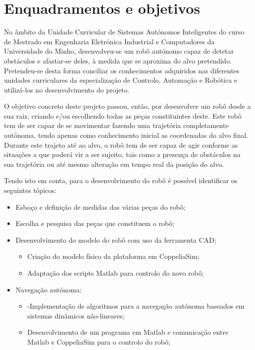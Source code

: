 \section{Enquadramentos e objetivos}
\label{sec:enq-e-obj}
%
No âmbito da Unidade Curricular de Sistemas Autónomos Inteligentes do curso de Mestrado em Engenharia Eletrónica Industrial e Computadores da Universidade do Minho, desenvolveu-se um robô autónomo capaz de detetar obstáculos e afastar-se deles, à medida que se aproxima do alvo pretendido. Pretendeu-se desta forma conciliar os conhecimentos adquiridos nas diferentes unidades curriculares da especialização de Controlo, Automação e Robótica e utilizá-los no desenvolvimento do projeto. 

O objetivo concreto deste projeto passou, então, por desenvolver um robô desde a sua raiz, criando e/ou escolhendo todas as peças constituintes deste. Este robô tem de ser capaz de se movimentar fazendo uma trajetória completamente autónoma, tendo apenas como conhecimento inicial as coordenadas do alvo final. Durante este trajeto até ao alvo, o robô tem de ser capaz de agir conforme as situações a que poderá vir a ser sujeito, tais como a presença de obstáculos na sua trajetória ou até mesmo alteração em tempo real da posição do alvo.  

Tendo isto em conta, para o desenvolvimento do robô é possível identificar os seguintes tópicos:

\begin{itemize}
\item Esboço e definição de medidas das várias peças do robô;
\item Escolha e pesquisa das peças que constituem o robô;
\item Desenvolvimento do modelo do robô com uso da ferramenta CAD;
    \begin{itemize}
        \item Criação do modelo físico da plataforma em CoppeliaSim; 
        \item Adaptação dos scripts Matlab para controlo do novo robô;
    \end{itemize}
\item Navegação autónoma:
    \begin{itemize}
        \item -Implementação de algoritmos para a navegação autónoma baseados em sistemas dinâmicos não-lineares;
        \item Desenvolvimento de um programa em Matlab e comunicação entre Matlab e CoppeliaSim para o controlo do robô; 

 
    \end{itemize}
\end{itemize}